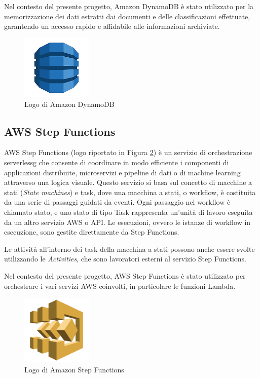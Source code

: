Nel contesto del presente progetto, Amazon DynamoDB è stato utilizzato per la memorizzazione dei dati estratti dai documenti e delle classificazioni effettuate, garantendo un accesso rapido e affidabile alle informazioni archiviate.



\begin{figure}[h]
  \centering
  \includegraphics[width=0.3\textwidth]{img/tecnologie/DynamoDB.png}
  \caption{Logo di Amazon DynamoDB}
  \label{fig:dynamodb}
\end{figure}
\subsection{AWS Step Functions}
AWS Step Functions (logo riportato in Figura \ref{fig:stepfunctions}) è un servizio di orchestrazione \gls{serverlessg} che consente di coordinare in modo efficiente i componenti di applicazioni distribuite, microservizi e pipeline di dati o di machine learning attraverso una logica visuale. Questo servizio si basa sul concetto di macchine a stati (\textit{State machines}) e task, dove una macchina a stati, o workflow, è costituita da una serie di passaggi guidati da eventi. Ogni passaggio nel workflow è chiamato stato, e uno stato di tipo Task rappresenta un'unità di lavoro eseguita da un altro servizio AWS o API. Le esecuzioni, ovvero le istanze di workflow in esecuzione, sono gestite direttamente da Step Functions.

Le attività all'interno dei task della macchina a stati possono anche essere svolte utilizzando le \textit{Activities}, che sono lavoratori esterni al servizio Step Functions.

Nel contesto del presente progetto, AWS Step Functions è stato utilizzato per orchestrare i vari servizi AWS coinvolti, in particolare le funzioni Lambda. 


\begin{figure}[h]
  \centering
  \includegraphics[width=0.3\textwidth]{img/tecnologie/stepfunctions.png}
  \caption{Logo di Amazon Step Functions}
  \label{fig:stepfunctions}
\end{figure}

